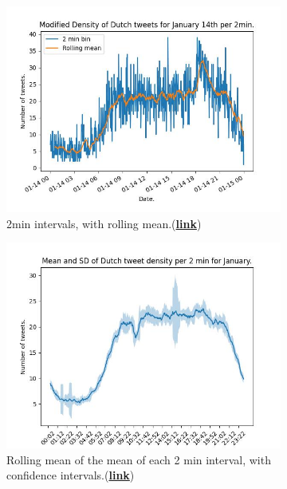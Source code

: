 \documentclass[10pt]{article}
\begin{document}
\begin{figure}[h!]
    \center
    \begin{subfigure}[b]{0.45\textwidth}
        \center
        \includegraphics[scale=0.45]{figures/JanNLD14roll.jpeg}
        \caption{2min intervals, with rolling mean.(\href{https://github.com/JamesZor/data-WranglingProject/blob/main/figures/JanNLD14roll.jpeg}{\color{blue}\textbf{link}})} 
        \label{fig:2a}
    \end{subfigure}
    \begin{subfigure}[b]{0.45\textwidth}
        \center
        \includegraphics[scale=0.45]{figures/JanNLdayfill.jpeg}
        \caption{Rolling mean of the mean of each 2 min interval, with confidence intervals.(\href{https://github.com/JamesZor/data-WranglingProject/blob/main/figures/JanNLdayfill.jpeg}{\color{blue}\textbf{link}})} 
        \label{fig:2b}
    \end{subfigure}
    \caption{}
    \label{fig:2g}
\end{figure}
\end{document}

